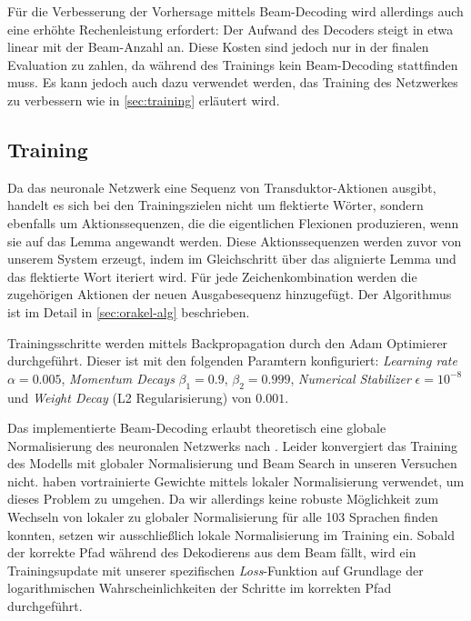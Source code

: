 \documentclass[11pt,a4paper]{article}
\begin{document}
Für die Verbesserung der Vorhersage mittels Beam-Decoding wird allerdings auch eine erhöhte Rechenleistung erfordert: Der Aufwand des Decoders steigt in etwa linear mit der Beam-Anzahl an. 
Diese Kosten sind jedoch nur in der finalen Evaluation zu zahlen, da während des Trainings kein Beam-Decoding stattfinden muss.
Es kann jedoch auch dazu verwendet werden, das Training des Netzwerkes zu verbessern wie in \autoref{sec:training} erläutert wird.

\subsection{Training}
\label{sec:training}

Da das neuronale Netzwerk eine Sequenz von Transduktor-Aktionen ausgibt, handelt es sich bei den Trainingszielen nicht um flektierte Wörter, sondern ebenfalls um Aktionssequenzen, die die eigentlichen Flexionen produzieren, wenn sie auf das Lemma angewandt werden.
Diese Aktionssequenzen werden zuvor von unserem System erzeugt, indem im Gleichschritt über das alignierte Lemma und das flektierte Wort iteriert wird.
Für jede Zeichenkombination werden die zugehörigen Aktionen der neuen Ausgabesequenz hinzugefügt.
Der Algorithmus ist im Detail in \autoref{sec:orakel-alg} beschrieben.

Trainingsschritte werden mittels Backpropagation durch den Adam Optimierer \citep{adam:KingmaB14} durchgeführt.
Dieser ist mit den folgenden Paramtern konfiguriert: \textit{Learning rate} $\alpha=0.005$, \textit{Momentum Decays} $\beta_1=0.9$, $\beta_2=0.999$, \textit{Numerical Stabilizer} $\epsilon=10^{-8}$ und \textit{Weight Decay} (L2 Regularisierung) von $0.001$.

Das implementierte Beam-Decoding erlaubt theoretisch eine globale Normalisierung des neuronalen Netzwerks nach \citet{globalnorm:AndorAWSPGPC16}.
Leider konvergiert das Training des Modells mit globaler Normalisierung und Beam Search in unseren Versuchen nicht.
\citet{globalnorm:AndorAWSPGPC16} haben vortrainierte Gewichte mittels lokaler Normalisierung verwendet, um dieses Problem zu umgehen.
Da wir allerdings keine robuste Möglichkeit zum Wechseln von lokaler zu globaler Normalisierung für alle 103 Sprachen finden konnten, setzen wir ausschließlich lokale Normalisierung im Training ein.
Sobald der korrekte Pfad während des Dekodierens aus dem Beam fällt, wird ein Trainingsupdate mit unserer spezifischen \textit{Loss}-Funktion auf Grundlage der logarithmischen Wahrscheinlichkeiten der Schritte im korrekten Pfad durchgeführt.
\end{document}
